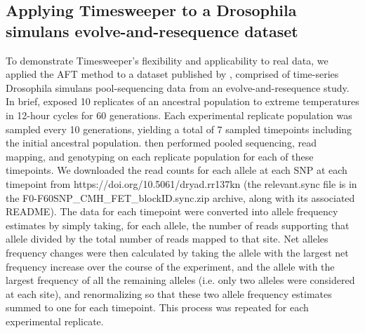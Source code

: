 \subsection{Applying Timesweeper to a Drosophila simulans evolve-and-resequence dataset}
To demonstrate Timesweeper’s flexibility and applicability to real data, we applied the AFT method to a dataset published by \cite{barghiGeneticRedundancyFuels2019}, comprised of time-series Drosophila simulans pool-sequencing data from an evolve-and-resequence study. In brief, \cite{barghiGeneticRedundancyFuels2019} exposed 10 replicates of an ancestral population to extreme temperatures in 12-hour cycles for 60 generations. Each experimental replicate population was sampled every 10 generations, yielding a total of 7 sampled timepoints including the initial ancestral population. \cite{barghiGeneticRedundancyFuels2019} then performed pooled sequencing, read mapping, and genotyping on each replicate population for each of these timepoints. We downloaded the read counts for each allele at each SNP at each timepoint from https://doi.org/10.5061/dryad.rr137kn (the relevant.sync file is in the F0-F60SNP\_CMH\_FET\_blockID.sync.zip archive, along with its associated README). The data for each timepoint were converted into allele frequency estimates by simply taking, for each allele, the number of reads supporting that allele divided by the total number of reads mapped to that site. Net alleles frequency changes were then calculated by taking the allele with the largest net frequency increase over the course of the experiment, and the allele with the largest frequency of all the remaining alleles (i.e. only two alleles were considered at each site), and renormalizing so that these two allele frequency estimates summed to one for each timepoint. This process was repeated for each experimental replicate. 

